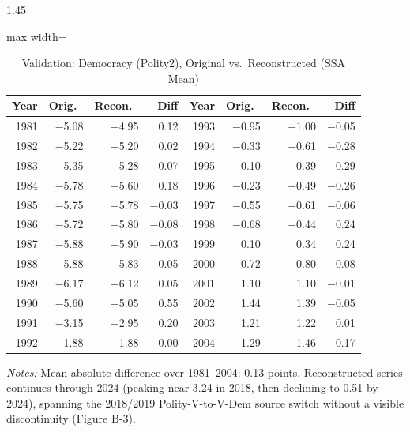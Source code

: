 \documentclass[12pt]{article}
\begin{document}
\begin{bibunit}[jpe]
\begin{spacing}{1.45}
\begin{table}[H]
\centering
\begin{adjustbox}{max width=\textwidth}
\begin{threeparttable}
\caption{Validation: Democracy (Polity2), Original vs.\ Reconstructed (SSA Mean)}
\label{tab:B6}
\begin{tabular}{rrrr|rrrr}
\toprule
Year & Orig.\ & Recon.\ & Diff & Year & Orig.\ & Recon.\ & Diff \\
\midrule
1981 & $-$5.08 & $-$4.95 & 0.12  & 1993 & $-$0.95 & $-$1.00 & $-$0.05 \\
1982 & $-$5.22 & $-$5.20 & 0.02  & 1994 & $-$0.33 & $-$0.61 & $-$0.28 \\
1983 & $-$5.35 & $-$5.28 & 0.07  & 1995 & $-$0.10 & $-$0.39 & $-$0.29 \\
1984 & $-$5.78 & $-$5.60 & 0.18  & 1996 & $-$0.23 & $-$0.49 & $-$0.26 \\
1985 & $-$5.75 & $-$5.78 & $-$0.03 & 1997 & $-$0.55 & $-$0.61 & $-$0.06 \\
1986 & $-$5.72 & $-$5.80 & $-$0.08 & 1998 & $-$0.68 & $-$0.44 & 0.24 \\
1987 & $-$5.88 & $-$5.90 & $-$0.03 & 1999 & 0.10   & 0.34   & 0.24 \\
1988 & $-$5.88 & $-$5.83 & 0.05  & 2000 & 0.72   & 0.80   & 0.08 \\
1989 & $-$6.17 & $-$6.12 & 0.05  & 2001 & 1.10   & 1.10   & $-$0.01 \\
1990 & $-$5.60 & $-$5.05 & 0.55  & 2002 & 1.44   & 1.39   & $-$0.05 \\
1991 & $-$3.15 & $-$2.95 & 0.20  & 2003 & 1.21   & 1.22   & 0.01 \\
1992 & $-$1.88 & $-$1.88 & $-$0.00 & 2004 & 1.29   & 1.46   & 0.17 \\
\bottomrule
\end{tabular}
\begin{tablenotes}[flushleft]
\footnotesize
\item \textit{Notes:} Mean absolute difference over 1981--2004: 0.13 points. Reconstructed series continues through 2024 (peaking near 3.24 in 2018, then declining to 0.51 by 2024), spanning the 2018/2019 Polity-V-to-V-Dem source switch without a visible discontinuity (Figure B-3).
\end{tablenotes}
\end{threeparttable}
\end{adjustbox}
\end{table}


\end{spacing}
\end{bibunit}
\end{document}
